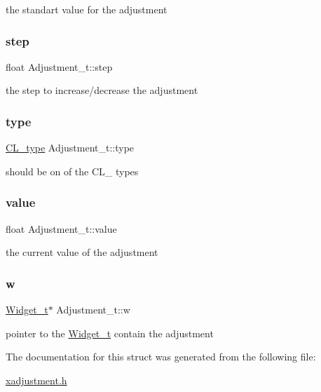 the standart value for the adjustment \mbox{\label{structAdjustment__t_a0198d0a412f8642b3e8a308f9240d467}} 
\subsubsection{\texorpdfstring{step}{step}}
{\footnotesize\ttfamily float Adjustment\+\_\+t\+::step}

the step to increase/decrease the adjustment \mbox{\label{structAdjustment__t_a1ec53b702dc4707522249f3cb5cbf6b3}} 
\subsubsection{\texorpdfstring{type}{type}}
{\footnotesize\ttfamily \hyperlink{xadjustment_8h_aefe5e135b1a0eab4675337a0967a7743}{C\+L\+\_\+type} Adjustment\+\_\+t\+::type}

should be on of the C\+L\+\_\+ types \mbox{\label{structAdjustment__t_acb1f8fb06d9e505f9f50e9178256215c}} 
\subsubsection{\texorpdfstring{value}{value}}
{\footnotesize\ttfamily float Adjustment\+\_\+t\+::value}

the current value of the adjustment \mbox{\label{structAdjustment__t_a82c03e6ceb092314a75bd10ba918f9d7}} 
\subsubsection{\texorpdfstring{w}{w}}
{\footnotesize\ttfamily \hyperlink{structWidget__t}{Widget\+\_\+t}$\ast$ Adjustment\+\_\+t\+::w}

pointer to the \hyperlink{structWidget__t}{Widget\+\_\+t} contain the adjustment 

The documentation for this struct was generated from the following file\+:\begin{DoxyCompactItemize}
\item 
\hyperlink{xadjustment_8h}{xadjustment.\+h}\end{DoxyCompactItemize}
